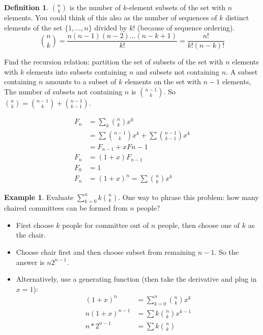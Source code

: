 \documentclass[12pt]{article}
\theoremstyle{definition}
\newtheorem{defn}{Definition}
\newtheorem{exmp}{Example}[section]
\begin{document}
\begin{defn}
    ${n \choose k}$ is the number of $k$-element subsets of the set with $n$
    elements. You could think of this also as the number of sequences of $k$
    distinct elements of the set $\{1, \ldots, n\}$ divided by $k!$ (because of
    sequence ordering).
    $${n \choose k} = \frac{n(n-1)(n-2)\ldots(n-k+1)}{k!} = \frac{n!}{k!(n-k)!}$$
\end{defn}


Find the recursion relation: partition the set of subsets of the set with $n$
elements with $k$ elements into subsets containing $n$ and subsets not
containing $n$. A subset containing $n$ amounts to a subset of $k$ elements on
the set with $n-1$ elements, The number of subsets not containing $n$ is ${n-1
\choose k}$. So ${n \choose k} = {n-1 \choose k} + {n - 1 \choose k - 1}$.

\begin{align*}
    F_n &= \sum_k {n \choose k}x^k \\
    &= \sum {n-1 \choose k} x^k + \sum {n - 1 \choose k - 1}x^k \\
    &= F_{n-1} + xF{n-1}\\
    F_n &= (1 + x)F_{n-1}\\
    F_0 &= 1\\
    F_n &= (1 + x)^n = \sum {n \choose k} x^k
\end{align*}

\begin{exmp}
Evaluate $\sum_{k=0}^n k{n \choose k}$. One way to phrase this problem:
how many chaired committees can be formed from $n$ people?
\end{exmp}

\begin{itemize}
\item First choose $k$ people for committee out of $n$ people, then choose one
    of $k$ as the chair.
\item Choose chair first and then choose subset from remaining $n-1$. So the
    answer is $n2^{n-1}$.
\item Alternatively, use a generating function (then take the derivative and
    plug in $x = 1$):
    \begin{align*}
        (1 +x)^n &= \sum_{k=0}^n {n \choose k}x^k\\
        n(1 + x)^{n-1} &= \sum k {n \choose k} x^{k-1}\\
        n * 2^{n-1} &= \sum k {n \choose k}
    \end{align*}
\end{itemize}
\end{document}
